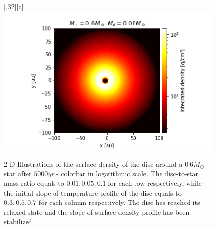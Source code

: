 \documentclass[aps,prb,twocolumn,superscriptaddress,floatfix,longbibliography]{revtex4-2}
\begin{document}
\begin{appendices}
\begin{figure}[!htbp]
  \subcaptionbox*{}[.32\linewidth][c]{%
    \includegraphics[width=\linewidth]{Graphs_2D/r_0.6s_0.06d_0.7q_2D.png}}\quad
  \caption{2-D Illustrations of the surface density of the disc around a $0.6 M_{\odot}$ star after $5000yr$ - colorbar in logarithmic scale. The disc-to-star mass ratio equals to $0.01, 0.05, 0.1$ for each row respectively, while the initial slope of temperature profile of the disc equals to $0.3, 0.5, 0.7$ for each column respectively. The disc has reached its relaxed state and the slope of surface density profile has been stabilized}
\end{figure}


\end{appendices}
\end{document}
